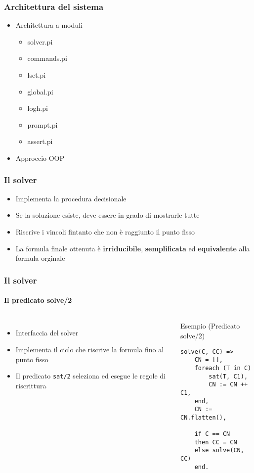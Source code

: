 \documentclass{beamer}
\begin{document}
\begin{frame}
  \frametitle{Architettura del sistema}
  \begin{itemize}
  \item Architettura a moduli
    \begin{itemize}
    \item solver.pi
    \item commands.pi
    \item lset.pi
    \item global.pi
    \item log\textunderscore h.pi
    \item prompt.pi
    \item assert.pi
    \end{itemize}
  \item Approccio OOP
  \end{itemize}
\end{frame}


\begin{frame}
  \frametitle{Il solver}
  \begin{itemize}
  \item Implementa la procedura decisionale \satset{}
  \item Se la soluzione esiste, deve essere in grado di mostrarle tutte
  \item Riscrive i vincoli fintanto che non è raggiunto il punto fisso
  \item La formula finale ottenuta è \textbf{irriducibile}, \textbf{semplificata} ed \textbf{equivalente} alla formula orginale
  \end{itemize}
\end{frame}


\begin{frame}[fragile]
  \frametitle{Il solver}
  \framesubtitle{Il predicato solve/2}
  
  \begin{columns}[c]
    \begin{itemize}
    \item Interfaccia del solver
    \item Implementa il ciclo che riscrive la formula fino al punto fisso
    \item Il predicato \texttt{sat/2} seleziona ed esegue le regole di riscrittura
    \end{itemize}

    \begin{exampleblock}{Esempio (Predicato solve/2)}
\begin{verbatim}
solve(C, CC) =>
    CN = [],
    foreach (T in C)
        sat(T, C1),
        CN := CN ++ C1,
    end,
    CN := CN.flatten(),
    
    if C == CN
    then CC = CN
    else solve(CN, CC)
    end.
\end{verbatim}
    \end{exampleblock}	
  \end{columns}
\end{frame}
\end{document}
